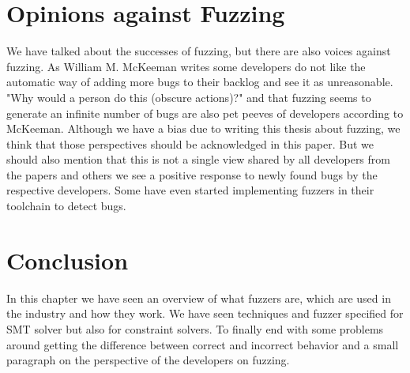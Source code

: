 \section{Opinions against Fuzzing}
\label{fuzzing:OpinionsAgainstFuzzing}
We have talked about the successes of fuzzing, but there are also voices against fuzzing. As William M. McKeeman \cite{39differentialTesting} writes some developers do not like the automatic way of adding more bugs to their backlog and see it as unreasonable. "Why would a person do this (obscure actions)?" and that fuzzing seems to generate an infinite number of bugs are also pet peeves of developers according to McKeeman.
Although we have a bias due to writing this thesis about fuzzing, we think that those perspectives should be acknowledged in this paper. But we should also mention that this is not a single view shared by all developers from the papers \cite{43YinYang, 42FalconFuzzingConfigurationSettingsAndNormal, 47zhang2019finding} and others we see a positive response to newly found bugs by the respective developers. Some have even started implementing fuzzers \cite{44Stringfuzz} in their toolchain to detect bugs.

\section{Conclusion}
\label{fuzzing:conclusion}
In this chapter we have seen an overview of what fuzzers are, which are used in the industry and how they work. We have seen techniques and fuzzer specified for SMT solver but also for constraint solvers. To finally end with some problems around getting the difference between correct and incorrect behavior and a small paragraph on the perspective of the developers on fuzzing.

